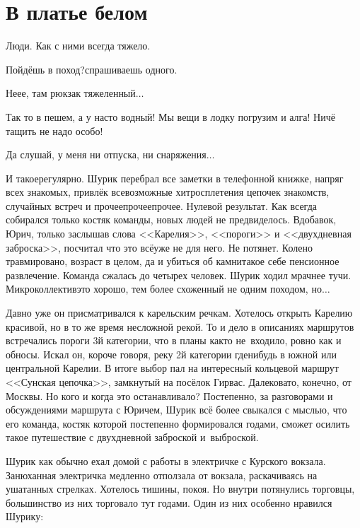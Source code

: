 {
\chapter{В платье белом}
\vepsianrose

\fancyhead[LE]{\fancyplain{}{\bfseries \parttitle}}
\fancyhead[RO]{\fancyplain{}{\bfseries \rightmark}}

Люди. Как с ними всегда тяжело.

\diagdash Пойдёшь в поход?\mdash спрашиваешь одного.

\diagdash Не\sdash е\sdash е, там рюкзак тяжеленный$\ldots$

\diagdash Так то в пешем, а у нас\sdash то водный! Мы вещи в лодку погрузим и алга! Ничё тащить не надо особо!

\diagdash Да слушай, у меня ни отпуска, ни снаряжения$\ldots$

И такое\mdash регулярно. Шурик перебрал все заметки в телефонной книжке, напряг всех знакомых, привлёк всевозможные хитросплетения цепочек знакомств, случайных встреч и прочее\sdash прочее\sdash прочее. Нулевой результат. Как всегда собирался только костяк команды, новых людей не предвиделось. Вдобавок, Юрич, только заслышав слова <<Карелия>>, <<пороги>> и <<двухдневная заброска>>, посчитал что это всё\mdash уже не для него. Не потянет. Колено травмировано, возраст в целом, да и убиться об камни\mdash такое себе пенсионное развлечение. Команда сжалась до четырех человек. Шурик ходил мрачнее тучи. Микроколлектив\mdash это хорошо, тем более схоженный не одним походом, но$\ldots$

Давно уже он присматривался к карельским речкам. Хотелось открыть Карелию красивой, но в то же время несложной рекой. То и дело в описаниях маршрутов встречались пороги 3\sdash й категории, что в планы как\sdash то не~входило, ровно как и обносы. Искал он, короче говоря, реку 2\sdash й категории где\sdash нибудь в южной или центральной Карелии. В итоге выбор пал на интересный кольцевой маршрут <<Сунская цепочка>>, замкнутый на посёлок Гирвас. Далековато, конечно, от Москвы. Но кого и когда это останавливало? Постепенно, за разговорами и обсуждениями маршрута с Юричем, Шурик всё более свыкался с мыслью, что его команда, костяк которой постепенно формировался годами, сможет осилить такое путешествие с двухдневной заброской и~выброской. 

Шурик как обычно ехал домой с работы в электричке с Курского вокзала. Занюханная электричка медленно отползала от вокзала, раскачиваясь на ушатанных стрелках. Хотелось тишины, покоя. Но внутри потянулись торговцы, большинство из них торговало тут годами. Один из них особенно нравился Шурику:

}

